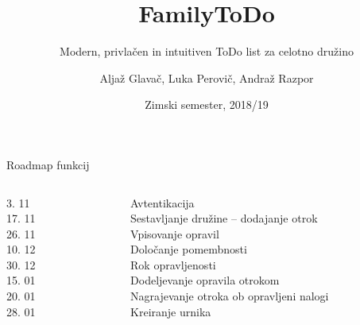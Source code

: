 \documentclass[10pt]{beamer}
\title{FamilyToDo}
\subtitle{Modern, privlačen in intuitiven ToDo list za celotno družino}
\date{Zimski semester, 2018/19}
\author{Aljaž Glavač, Luka Perovič, Andraž Razpor}
\institute{Univerza v Ljubljani, Fakulteta za računalništvo in informatiko}
\begin{document}
\maketitle


\begin{frame}{Roadmap funkcij}
\begin{columns}[c]
    \begin{column}{0.1\textwidth}
        \hfill 3. 11 \\
        \hfill 17. 11 \\
        \hfill 26. 11 \\
        \hfill 10. 12 \\
        \hfill 30. 12 \\
        \hfill 15. 01 \\
				\hfill 20. 01 \\
        \hfill 28. 01 \\
    \end{column}
    \hspace{-15pt}\vrule\hspace{5pt}%
    \begin{column}{0.9\textwidth}  %
            Avtentikacija \\
            Sestavljanje družine -- dodajanje otrok \\
            Vpisovanje opravil \\
            Določanje pomembnosti \\
            Rok opravljenosti \\
            Dodeljevanje opravila otrokom \\
						Nagrajevanje otroka ob opravljeni nalogi \\
            Kreiranje urnika \\
    \end{column}
\end{columns}
\end{frame}

\end{document}
